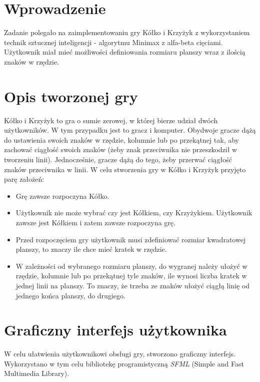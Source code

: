 \documentclass[12pt]{article}
\begin{document}
\renewcommand{\figurename}{Rys.}
\renewcommand{\tablename}{Tab.}
    

\tableofcontents
\newpage

\section{Wprowadzenie}
Zadanie polegało na zaimplementowaniu gry Kółko i Krzyżyk z wykorzystaniem technik sztucznej inteligencji - algorytmu Minimax z alfa-beta cięciami. Użytkownik miał mieć możliwości definiowania rozmiaru planszy wraz z ilością znaków w rzędzie. 

\section{Opis tworzonej gry}
Kółko i Krzyżyk to gra o sumie zerowej, w której bierze udział dwóch użytkowników. W tym przypadku jest to gracz i komputer. Obydwoje gracze dążą do ustawienia swoich znaków w rzędzie, kolumnie lub po przekątnej tak, aby zachować ciągłość swoich znaków (żeby znak przeciwnika nie przeszkodził w tworzeniu linii). Jednocześnie, gracze dążą do tego, żeby przerwać ciągłość znaków przeciwnika w linii. W celu stworzenia gry w Kółko i Krzyżyk przyjęto parę założeń:
\begin{itemize}
    \item Grę zawsze rozpoczyna Kółko.
    \item Użytkownik nie może wybrać czy jest Kółkiem, czy Krzyżykiem. Użytkownik zawsze jest Kółkiem i zatem zawsze rozpoczyna grę.
    \item Przed rozpoczęciem gry użytkownik musi zdefiniować rozmiar kwadratowej planszy, to znaczy ile chce mieć kratek w rzędzie.
    \item W zależności od wybranego rozmiaru planszy, do wygranej należy ułożyć w rzędzie, kolumnie lub po przekątnej tyle znaków, ile wynosi liczba kratek w jednej linii na planszy. To znaczy, że trzeba ze znaków ułożyć ciągłą linię od jednego końca planszy, do drugiego. 
\end{itemize}

\section{Graficzny interfejs użytkownika}
W celu ułatwienia użytkownikowi obsługi gry, stworzono graficzny interfejs. Wykorzystano w tym celu bibliotekę programistyczną \textit{SFML} (Simple and Fast Multimedia Library).
\end{document}
